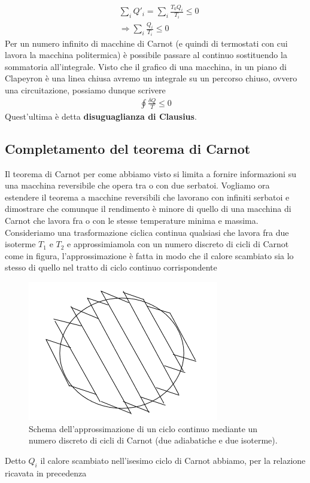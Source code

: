 \documentclass[10pt,a4paper]{article}
\begin{document}
\begin{align*}
	&\sum_i Q'_i = \sum_i\frac{T_0 Q_i}{T_i}\leq 0\\
	&\Rightarrow \sum_i \frac{Q_i}{T_i}\leq 0
\end{align*}
Per un numero infinito di macchine di Carnot (e quindi di termostati con cui lavora la macchina politermica) è possibile passare al continuo sostituendo la sommatoria all'integrale. Visto che il grafico di una macchina, in un piano di Clapeyron è una linea chiusa avremo un integrale su un percorso chiuso, ovvero una circuitazione, possiamo dunque scrivere
\begin{align*}
	\oint \frac{\delta Q}{T}\leq 0
\end{align*}
Quest'ultima è detta \textbf{disuguaglianza di Clausius}.
\subsection{Completamento del teorema di Carnot}
Il teorema di Carnot per come abbiamo visto si limita a fornire informazioni su una macchina reversibile che opera tra o con due serbatoi. Vogliamo ora estendere il teorema a macchine reversibili che lavorano con infiniti serbatoi e dimostrare che comunque il rendimento è minore di quello di una macchina di Carnot che lavora fra o con le stesse temperature minima e massima.\\
Consideriamo una trasformazione ciclica continua qualsiasi che lavora fra due isoterme \(T_1\) e \(T_2\) e approssimiamola con un numero discreto di cicli di Carnot come in figura, l'approssimazione è fatta in modo che il calore scambiato sia lo stesso di quello nel tratto di ciclo continuo corrispondente
\begin{figure}[h!]
	\centering
	\includegraphics[width=0.5\linewidth]{../images/ciclo_continuo}
	\caption{Schema dell'approssimazione di un ciclo continuo mediante un numero discreto di cicli di Carnot (due adiabatiche e due isoterme).}
	\label{fig:ciclocontinuo}
\end{figure}
\FloatBarrier
Detto \(Q_i\) il calore scambiato nell'isesimo ciclo di Carnot abbiamo, per la relazione ricavata in precedenza
\end{document}
